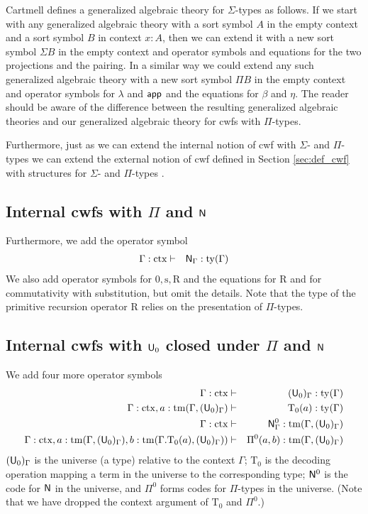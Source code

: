 \documentclass{mscs}
\newcommand{\FYI}[1]{{#1}}
\newcommand{\s}{\mathrm{s}}
\newcommand{\Rec}{\mathrm{R}}
\newcommand{\Ta}{\mathrm{T}}
\newcommand{\ctx}{\mathrm{ctx}}
\newcommand{\ty}{\mathrm{ty}}
\newcommand{\tm}{\mathrm{tm}}
\begin{document}
\begin{remark}
Cartmell \cite{cartmell:apal} defines a generalized algebraic theory for $\Sigma$-types as follows. If we start with any generalized algebraic theory with a sort symbol $A$ in the empty context and  a sort symbol $B$ in context $x:A$, then we can extend it with a new sort symbol $\Sigma B$ in the empty context and operator symbols and equations for the two projections and the pairing. In a similar way we could extend any such generalized algebraic theory with a new sort symbol $\Pi B$ in the empty context and operator symbols for $\lambda$ and $\mathsf{app}$ and the equations for $\beta$ and $\eta$. The reader should be aware of the difference between the resulting generalized algebraic theories and our generalized algebraic theory for cwfs with $\Pi$-types.
\end{remark}

\begin{remark}
Furthermore, just as we can extend the internal notion of cwf with $\Sigma$- and $\Pi$-types we can extend the external notion of cwf defined in Section \ref{sec:def_cwf} with structures for $\Sigma$- and $\Pi$-types \cite{castellan:tlca2015,castellan:lmcs}.
\end{remark}

\subsection{Internal cwfs with $\Pi$ and $\mathsf{N}$}
Furthermore, we add the operator symbol
\begin{eqnarray*}
\Gamma : \ctx &\vdash& \N_\Gamma : \ty(\Gamma)
\end{eqnarray*}
We also add operator symbols for $0, \s, \Rec$ and the equations for $\Rec$ and for commutativity with substitution, but omit the details. Note that the type of the primitive recursion operator $\Rec$ relies on the \FYI{presentation of} $\Pi$-types.

\subsection{Internal cwfs with $\mathsf{U}_0$ closed under $\Pi$ and $\mathsf{N}$}\label{sec:u-example}
We add four more operator symbols
\begin{eqnarray*}
\Gamma : \ctx &\vdash& (\U_0)_\Gamma : \ty(\Gamma)\\
\Gamma : \ctx, a : \tm(\Gamma,(\U_0)_\Gamma) &\vdash& {\Ta_0}(a) : \ty(\Gamma)\\
\Gamma : \ctx &\vdash& \N^0_\Gamma : \tm(\Gamma,(\U_0)_\Gamma) \\
\Gamma : \ctx,
a : \tm(\Gamma,(\U_0)_\Gamma),
b :  \tm(\Gamma  .  \Ta_0(a), (\U_0)_\Gamma))
&\vdash&
 \Pi^0(a,b) : \tm(\Gamma,(\U_0)_\Gamma)
\end{eqnarray*}
$(\mathsf{U}_0)_\Gamma$ is the universe (a type) relative to the context $\Gamma$; $\Ta_0$ is the decoding operation mapping a term in the universe to the corresponding type; $\mathsf{N}^0$ is the code for $\mathsf{N}$ in the universe, and $\Pi^0$ forms codes for $\Pi$-types in the
 universe. (Note that we have dropped the context argument of $\Ta_0$ and $\Pi^0$.)
\end{document}
